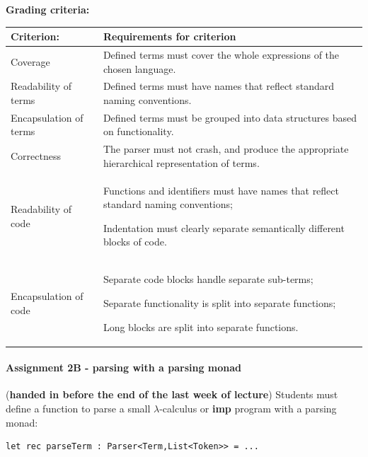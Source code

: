 \documentclass[a4paper, 10pt]{article}
\begin{document}
			\textbf{Grading criteria:} \\
				\begin{tabularx}{\textwidth}{|>{\columncolor{lichtGrijs}} X | p{}|}
					\hline
					\textbf{Criterion:} & \textbf{Requirements for criterion} \\
					\hline
					Coverage & Defined terms must cover the whole expressions of the chosen language. \\
					\hline
					Readability of terms & Defined terms must have names that reflect standard naming conventions. \\
					\hline
					Encapsulation of terms & Defined terms must be grouped into data structures based on functionality. \\
					\hline
					Correctness & The parser must not crash, and produce the appropriate hierarchical representation of terms. \\
					\hline
					Readability of code & 
						\begin{inparaenum}
							\item Functions and identifiers must have names that reflect standard naming conventions;
							\item Indentation must clearly separate semantically different blocks of code.
						\end{inparaenum} \\
					\hline
					Encapsulation of code & 
						\begin{inparaenum}
							\item Separate code blocks handle separate sub-terms;
							\item Separate functionality is split into separate functions;
							\item Long blocks are split into separate functions.
						\end{inparaenum} \\
					\hline
				\end{tabularx}			
			
		\paragraph*{Assignment 2B - parsing with a parsing monad} (\textbf{handed in before the end of the last week of lecture})
			Students must define a function to parse a small $\lambda$-calculus or \textbf{imp} program with a parsing monad:

			\begin{lstlisting}
let rec parseTerm : Parser<Term,List<Token>> = ...
			\end{lstlisting}
\end{document}
